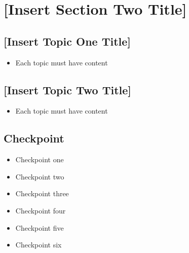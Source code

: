 \documentclass[../workbook]{subfiles}
\begin{document}
\section{[Insert Section Two Title]}

\begin{sectiontopics}
\end{sectiontopics}



\subsection{[Insert Topic One Title]}

\begin{itemize}
\item Each topic must have content
\end{itemize}
    


\subsection{[Insert Topic Two Title]}

\begin{itemize}
\item Each topic must have content
\end{itemize}
    


\subsection{Checkpoint}

\begin{itemize}
\item Checkpoint one
\item Checkpoint two
\item Checkpoint three
\item Checkpoint four
\item Checkpoint five
\item Checkpoint six
\end{itemize}
\end{document}
